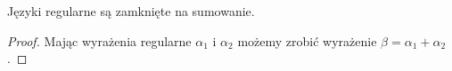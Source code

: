 \begin{theorem}
Języki regularne są zamknięte na sumowanie.
\end{theorem}
\begin{proof}
 Mając wyrażenia regularne \(\alpha_1\) i \(\alpha_2\) możemy zrobić wyrażenie \(\beta = \alpha_1 + \alpha_2\).
\end{proof}
